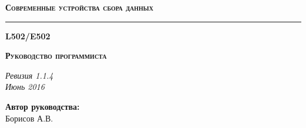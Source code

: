 \documentclass[12pt,a4paper,titlepage]{report}
\begin{document}
  \begin{titlepage}
    \topmargin=10mm
    \vspace{45mm}

    \begin{flushright}
    {\bfseries\scshape\Large Современные устройства сбора данных}
    \end{flushright}

    \rule{160mm}{2mm}                %

    \begin{flushright}
    {\bfseries\scshape\Huge L502/E502}
    \end{flushright}

    \begin{flushright}
    {\bfseries\scshape\Large Руководство программиста}
    \end{flushright}

    \vspace{155mm}


	
    \noindent
    \begin{flushright}
    {\itshape\footnotesize Ревизия 1.1.4 \\ Июнь 2016}
    \end{flushright}

  \end{titlepage}
  
  
  \vspace{5mm}
  \begin{flushleft}
  \textbf{Автор руководства:} \\
  Борисов А.В.
  \end{flushleft}
  
\end{document}
